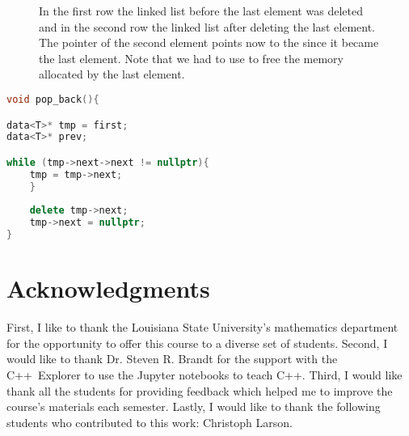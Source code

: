 \documentclass[11pt,fleqn]{book} %
\begin{document}
\begin{figure}[h]
\centering
{}
\caption{In the first row the linked list before the last element was deleted and in the second row the linked list after deleting the last element. The pointer  of the second element points now to the  since it became the last element. Note that we had to use  to free the memory allocated by the last element.}
\label{fig:sketch:linked:remove last}
\end{figure}


\begin{lstlisting}[language=c++,caption={Implementation of the \cpp{pop_back} function of a linked list.\label{code:list:pop_back}},float,floatplacement=tb]
void pop_back(){

data<T>* tmp = first;
data<T>* prev;

while (tmp->next->next != nullptr){
    tmp = tmp->next;
    }
    
    delete tmp->next;
    tmp->next = nullptr;
}
\end{lstlisting}

\chapter{Acknowledgments}

First, I like to thank the Louisiana State University's mathematics department for the opportunity to offer this course to a diverse set of students. Second, I would like to thank Dr. Steven R. Brandt for the support with the C++\ Explorer to use the Jupyter notebooks to teach C++. Third, I would like thank all the students for providing feedback which helped me to improve the course's materials each semester. Lastly, I would like to thank the following students who contributed to this work: Christoph Larson.
\end{document}
